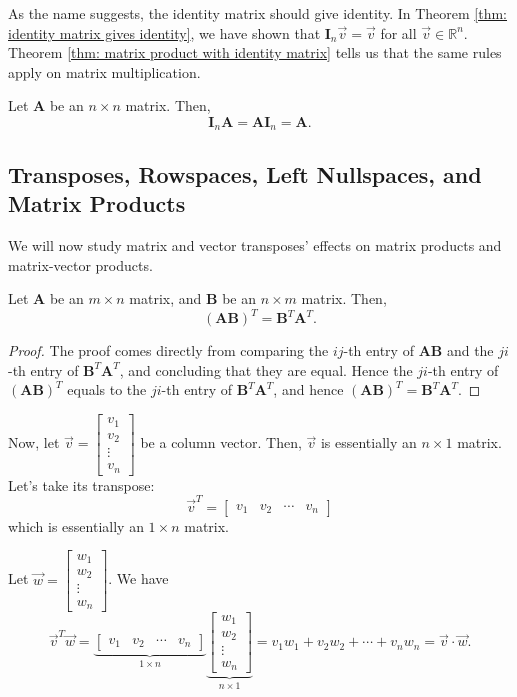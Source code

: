 \documentclass[]{book}
\newcommand{\vecxxdx}[1][x]{\ensuremath{\begin{bmatrix}
#1_1 \\
#1_2 \\
\vdots \\
#1_n
\end{bmatrix}}}
\newcommand{\mat}[1]{\ensuremath{\mathbf{#1}}}
\newcommand{\idmat}[1][n]{\ensuremath{\mat{I}_#1}}
\newcommand{\R}{\ensuremath{\mathbb{R}}}
\begin{document}
As the name suggests, the identity matrix should give identity. In Theorem \ref{thm: identity matrix gives identity}, we have shown that $\idmat[n]\vec{v} = \vec{v}$ for all $\vec{v} \in \R^n$. Theorem \ref{thm: matrix product with identity matrix} tells us that the same rules apply on matrix multiplication.
\begin{theorem}
    \label{thm: matrix product with identity matrix}
    Let $\mat{A}$ be an $n \times n$ matrix. Then, 
    \[\idmat[n]\mat{A} = \mat{A}\idmat[n] = \mat{A}.\]
\end{theorem}


\subsection{Transposes, Rowspaces, Left Nullspaces, and Matrix Products}
\label{section: transposes, rowspaces, left nullspaces, and matrix products}
We will now study matrix and vector transposes' effects on matrix products and matrix-vector products.
\begin{theorem}
    \label{thm: transpose of matrix products}
    Let $\mat{A}$ be an $m \times n$ matrix, and $\mat{B}$ be an $n \times m$ matrix. Then,
    \[\left(\mat{A}\mat{B}\right)^T = \mat{B}^T\mat{A}^T.\]
\begin{proof}
    The proof comes directly from comparing the $ij$-th entry of $\mat{A}\mat{B}$ and the $ji$-th entry of $\mat{B}^T\mat{A}^T$, and concluding that they are equal. Hence the $ji$-th entry of $\left(\mat{A}\mat{B}\right)^T$ equals to the $ji$-th entry of $\mat{B}^T\mat{A}^T$, and hence $\left(\mat{A}\mat{B}\right)^T = \mat{B}^T\mat{A}^T$.
\end{proof}
\end{theorem}

Now, let $\vec{v} = \vecxxdx[v]$ be a column vector. Then, $\vec{v}$ is essentially an $n \times 1$ matrix. Let's take its transpose:
\[\vec{v}^T = \begin{bmatrix}v_1 & v_2 & \cdots & v_n\end{bmatrix}\]
which is essentially an $1 \times n$ matrix.

Let $\vec{w} = \vecxxdx[w]$. We have
\[\vec{v}^T\vec{w} = \underbrace{\begin{bmatrix}v_1 & v_2 & \cdots & v_n\end{bmatrix}}_{1 \times n} \underbrace{\vecxxdx[w]}_{n \times 1}=v_1w_1 + v_2w_2 + \cdots + v_nw_n = \vec{v}\cdot\vec{w}.\]
\end{document}
